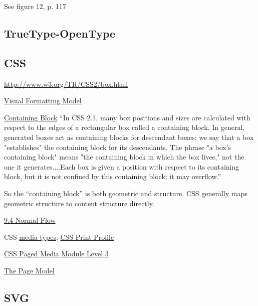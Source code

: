 \documentclass[12pt]{tufte-handout}
\numberwithin{equation}{subsection}
\numberwithin{equation}{subsection}
\begin{document}
\begin{appendices}
                See figure 12, p. 117

                \subsection{TrueType-OpenType}
                \label{subs:ttf}


                \subsection{CSS}

                \url{http://www.w3.org/TR/CSS2/box.html}

                \href{http://www.w3.org/TR/CSS2/visuren.html}{Visual Formatting Model}

                \href{http://www.w3.org/TR/CSS2/visuren.html#containing-block}{Containing
                  Block} ``In CSS 2.1, many box positions and sizes are calculated
                with respect to the edges of a rectangular box called a containing
                block. In general, generated boxes act as containing blocks for
                descendant boxes; we say that a box "establishes" the containing block
                for its descendants. The phrase "a box's containing block" means "the
                containing block in which the box lives," not the one it
                generates....Each box is given a position with respect to its
                containing block, but it is not confined by this containing block; it
                may overflow.''

                So the ``containing block'' is both geometric and structure.  CSS
                generally maps geometric structure to content structure directly.

                \href{http://www.w3.org/TR/CSS2/visuren.html#normal-flow}{9.4 Normal Flow}

                CSS \href{http://www.w3.org/TR/CSS2/media.html}{media types}; \href{http://www.w3.org/TR/css-print/}{CSS Print Profile}

                \href{http://www.w3.org/TR/css3-page/}{CSS Paged Media Module Level 3}

                \href{http://www.w3.org/TR/css3-page/#page-model}{The Page Model}

                \subsection{SVG}


\end{appendices}
\end{document}
